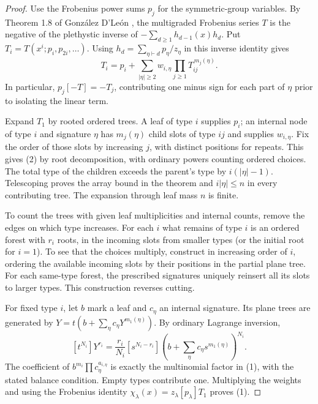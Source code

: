 \documentclass[11pt]{article}
\begin{document}
\begin{proof}
Use the Frobenius power sums $p_j$ for the symmetric-group variables.
By Theorem 1.8 of Gonz\'alez D'Le\'on \cite{g}, the multigraded Frobenius
series $T$ is the negative of the plethystic inverse of
$-\sum_{d\ge1}h_{d-1}(x)h_d$. Put $T_i=T(x^i;p_i,p_{2i},\ldots)$.
Using $h_d=\sum_{\eta\vdash d}p_\eta/z_\eta$ in this inverse identity gives
\[
 T_i=p_i+\sum_{|\eta|\ge2} w_{i,\eta}
                          \prod_{j\ge1}T_{ij}^{\,m_j(\eta)}.       \tag{2}
\]
In particular, $p_j[-T]=-T_j$, contributing one minus sign for each
part of $\eta$ prior to isolating the linear term.

Expand $T_1$ by rooted ordered trees. A leaf of type $i$ supplies $p_i$;
an internal node of type $i$ and signature $\eta$ has $m_j(\eta)$ child
slots of type $ij$ and supplies $w_{i,\eta}$. Fix the order of those slots
by increasing $j$, with distinct positions for repeats. This gives (2) by
root decomposition, with ordinary powers counting ordered choices. The total
type of the children exceeds the parent's type by $i(|\eta|-1)$.
Telescoping proves the array bound in the theorem and $i|\eta|\le n$ in
every contributing tree. The expansion through leaf mass $n$ is finite.

To count the trees with given leaf multiplicities and internal counts,
remove the edges on which type increases. For each $i$ what remains of
type $i$ is an ordered forest with $r_i$ roots, in the incoming slots from
smaller types (or the initial root for $i=1$). To see that the choices
multiply, construct in increasing order of $i$, ordering the available
incoming slots by their positions in the partial plane tree. For each
same-type forest, the prescribed signatures uniquely reinsert all its
slots to larger types. This construction reverses cutting.

For fixed type $i$, let $b$ mark a leaf and $c_\eta$ an internal signature.
Its plane trees are generated by $Y=t(b+\sum_\eta c_\eta
Y^{m_1(\eta)})$. By ordinary Lagrange inversion,
\[
 [t^{N_i}]Y^{r_i}=\frac{r_i}{N_i}[s^{N_i-r_i}]
               (b+\sum_\eta c_\eta s^{m_1(\eta)})^{N_i}.
\]
The coefficient of $b^{m_i}\prod c_\eta^{a_{i,\eta}}$ is exactly the
multinomial factor in (1), with the stated balance condition. Empty
types contribute one. Multiplying the weights and using the Frobenius
identity $\chi_\lambda(x)=z_\lambda[p_\lambda]T_1$ proves (1).
\end{proof}
\end{document}
